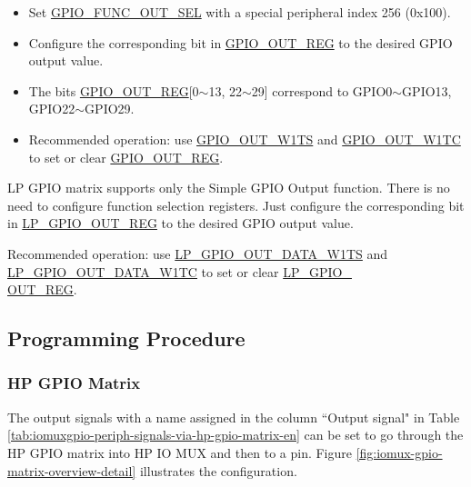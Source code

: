 \documentclass[main\_\_EN.tex]{subfiles}
\begin{document}
\begin{itemize}
    \item Set \hyperref[fielddesc:GPIOFUNCNOUTSEL]{GPIO\_FUNC\_OUT\_SEL} with a special peripheral index 256 (0x100).
    \item Configure the corresponding bit in \hyperref[regdesc:GPIOOUTREG]{GPIO\_OUT\_REG} to the desired GPIO output value.
\end{itemize}

\begin{tiplisting}
\vspace{-2em}
\begin{itemize}
\item The bits \hyperref[regdesc:GPIOOUTREG]{GPIO\_OUT\_REG}[0$\sim$13, 22$\sim$29] correspond to GPIO0$\sim$GPIO13, GPIO22$\sim$GPIO29.
\item Recommended operation: use \hyperref[fielddesc:GPIOOUTW1TS]{GPIO\_OUT\_W1TS} and \hyperref[fielddesc:GPIOOUTW1TC]{GPIO\_OUT\_W1TC} to set or clear \hyperref[regdesc:GPIOOUTREG]{GPIO\_OUT\_REG}.
\end{itemize}
\end{tiplisting}

LP GPIO matrix supports only the Simple GPIO Output function. There is no need to configure function selection registers. Just configure the corresponding bit in \hyperref[regdesc:LPGPIOOUTREG]{LP\_GPIO\_OUT\_REG} to the desired GPIO output value.
\begin{tiplisting}
Recommended operation: use \hyperref[fielddesc:LPGPIOOUTW1TS]{LP\_GPIO\_OUT\_DATA\_W1TS} and \hyperref[fielddesc:LPGPIOOUTW1TC]{LP\_GPIO\_OUT\_DATA\_W1TC} to set or clear \hyperref[regdesc:LPGPIOOUTREG]{LP\_GPIO\_\\OUT\_REG}.
\end{tiplisting}

\subsection{Programming Procedure}

\subsubsection{HP GPIO Matrix}
\label{sec:programming-procedure-hp-gpio-matrix-output}

The output signals with a name assigned in the column ``Output signal" in Table \ref{tab:iomuxgpio-periph-signals-via-hp-gpio-matrix-en} can be set to go through the HP GPIO matrix into HP IO MUX and then to a pin. Figure \ref{fig:iomux-gpio-matrix-overview-detail} illustrates the configuration.
\end{document}

